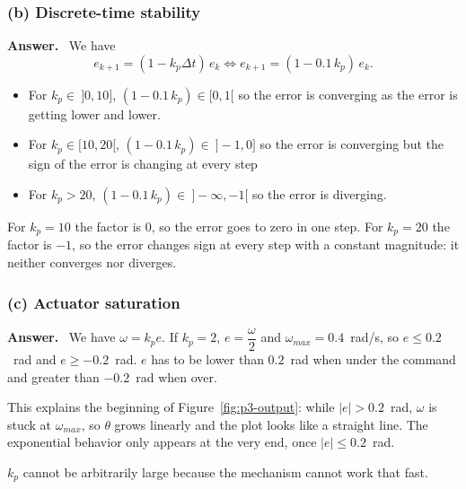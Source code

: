 \documentclass[11pt]{article}
\newenvironment{answer}
  {\par\medskip\noindent\textbf{Answer.}\ }
  {\par\medskip}
\begin{document}
\subsubsection*{(b) Discrete-time stability}
\begin{answer}
  We have
  \[
    e_{k+1} = (1 - k_p \Delta t)\, e_k \iff e_{k+1} = (1 - 0.1\, k_p)\, e_k .
  \]
  \begin{itemize}
    \item For $k_p \in\ ]0, 10]$, $(1 - 0.1\, k_p) \in [0, 1[$ so the error is converging as the error is getting lower and lower.
    \item For $k_p \in [10, 20[$, $(1 - 0.1\, k_p) \in\ ]-1, 0]$ so the error is converging but the sign of the error is changing at every step
    \item For $k_p > 20$, $(1 - 0.1\, k_p) \in\ ]-\infty, -1[$ so the error is diverging.
  \end{itemize}
  For $k_p = 10$ the factor is $0$, so the error goes to zero in one step. For $k_p = 20$ the factor is $-1$, so the error changes sign at every step with a constant magnitude: it neither converges nor diverges.
\end{answer}

\subsubsection*{(c) Actuator saturation}
\begin{answer}
  We have $\omega = k_p e$. If $k_p = 2$, $e = \dfrac{\omega}{2}$ and $\omega_{max} = 0.4$~rad/s, so $e \leq 0.2$~rad and $e \geq -0.2$~rad.
  $e$ has to be lower than $0.2$~rad when under the command and greater than $-0.2$~rad when over.

  \medskip\noindent This explains the beginning of Figure~\ref{fig:p3-output}: while $|e| > 0.2$~rad, $\omega$ is stuck at $\omega_{max}$, so $\theta$ grows linearly and the plot looks like a straight line. The exponential behavior only appears at the very end, once $|e| \leq 0.2$~rad.

  \medskip\noindent $k_p$ cannot be arbitrarily large because the mechanism cannot work that fast.
\end{answer}
\end{document}
